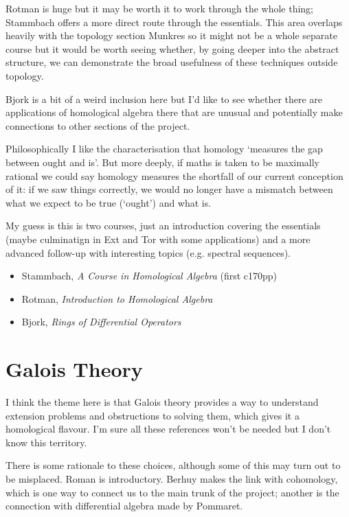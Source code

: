 \documentclass[article]{article}
\begin{document}
Rotman is huge but it may be worth it to work through the whole thing; Stammbach offers a more direct route through the essentials. This area overlaps heavily with the topology section Munkres so it might not be a whole separate course but it would be worth seeing whether, by going deeper into the abstract structure, we can demonstrate the broad usefulness of these techniques outside topology.

Bjork is a bit of a weird inclusion here but I'd like to see whether there are applications of homological algebra there that are unusual and potentially make connections to other sections of the project.

Philosophically I like the characterisation that homology `measures the gap between ought and is'. But more deeply, if maths is taken to be maximally rational we could say homology measures the shortfall of our current conception of it: if we saw things correctly, we would no longer have a mismatch between what we expect to be true (`ought') and what is.

My guess is this is two courses, just an introduction covering the essentials (maybe culminatign in Ext and Tor with some applications) and a more advanced follow-up with interesting topics (e.g. spectral sequences).

\begin{itemize}
	\item[]{Stammbach, \textit{A Course in Homological Algebra} (first c170pp)}
	\item[]{Rotman, \textit{Introduction to Homological Algebra}}
	\item[]{Bjork, \textit{Rings of Differential Operators}}
\end{itemize}

\section{Galois Theory}

I think the theme here is that Galois theory provides a way to understand extension problems and obstructions to solving them, which gives it a homological flavour. I'm sure all these references won't be needed but I don't know this territory.

There is some rationale to these choices, although some of this may turn out to be misplaced. Roman is introductory. Berhuy makes the link with cohomology, which is one way to connect us to the main trunk of the project; another is the connection with differential algebra made by Pommaret. 
\end{document}
